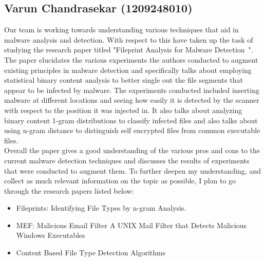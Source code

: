 \documentclass[11pt]{article}
\begin{document}
		\subsection{Varun Chandrasekar (1209248010)}
		Our team is working towards understanding various techniques that aid in malware analysis and detection. With respect to this have taken up the task of studying the research paper titled "Fileprint Analysis for Malware Detection~\cite{stolfo2005fileprint}". The paper elucidates the various experiments the authors conducted to augment existing principles in malware detection and specifically talks about employing statistical binary content analysis to better single out the file segments that appear to be infected by malware. The experiments conducted included inserting malware at different locations and seeing how easily it is detected by the scanner with respect to the position it was injected in. It also talks about analyzing binary content 1-gram distributions to classify infected files and also talks about using n-gram distance to distinguish self encrypted files from common executable files.\\
		Overall the paper gives a good understanding of the various pros and cons to the current malware detection techniques and discusses the results of experiments that were conducted to augment them. To further deepen my understanding, and collect as much relevant information on the topic as possible, I plan to go through the research papers listed below:
		\begin{itemize}[noitemsep]
			\item Fileprints: Identifying File Types by n-gram Analysis.~\cite{li2005fileprints}
			\item MEF: Malicious Email Filter A UNIX Mail Filter that Detects Malicious Windows Executables~\cite{schultz2001mef}
			\item Content Based File Type Detection Algorithms~\cite{mcdaniel2003content}
		\end{itemize}
\end{document}
